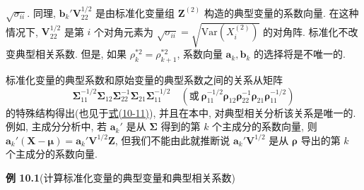 
$\sqrt{\sigma_{ii}}$. 同理, $\mathbf{b}_k'\mathbf{V}_{22}^{1/2}$ 是由标准化变量组 $\mathbf{Z}^{(2)}$ 构造的典型变量的系数向量. 在这种情况下, $\mathbf{V}_{22}^{1/2}$ 是第 $i$ 个对角元素为 $\sqrt{\sigma_{ii}}=\sqrt{\mathrm{Var}(X_i^{(2)})}$ 的对角阵. 标准化不改变典型相关系数. 但是, 如果 $\rho_k^{*2}=\rho_{k+1}^{*2}$, 系数向量 $\mathbf{a}_k,\mathbf{b}_k$ 的选择将是不唯一的.

标准化变量的典型系数和原始变量的典型系数之间的关系从矩阵
\[
\boldsymbol{\Sigma}_{11}^{-1/2}\boldsymbol{\Sigma}_{12}\boldsymbol{\Sigma}_{22}^{-1}\boldsymbol{\Sigma}_{21}\boldsymbol{\Sigma}_{11}^{-1/2}\quad (\text{或}\ \boldsymbol{\rho}_{11}^{-1/2}\boldsymbol{\rho}_{12}\boldsymbol{\rho}_{22}^{-1}\boldsymbol{\rho}_{21}\boldsymbol{\rho}_{11}^{-1/2})
\]
的特殊结构得出(也见于\hyperref[eq:10-11]{式(10-11)}), 并且在本中, 对典型相关分析该关系是唯一的. 例如, 主成分分析中, 若 $\mathbf{a}_k'$ 是从 $\boldsymbol{\Sigma}$ 得到的第 $k$ 个主成分的系数向量, 则 $\mathbf{a}_k'(\mathbf{X}-\boldsymbol{\mu})=\mathbf{a}_k'\mathbf{V}^{1/2}\mathbf{Z}$, 但我们不能由此就推断说 $\mathbf{a}_k'\mathbf{V}^{1/2}$ 是从 $\boldsymbol{\rho}$ 导出的第 $k$ 个主成分的系数向量.

\noindent\textbf{例 10.1}\quad (计算标准化变量的典型变量和典型相关系数)


